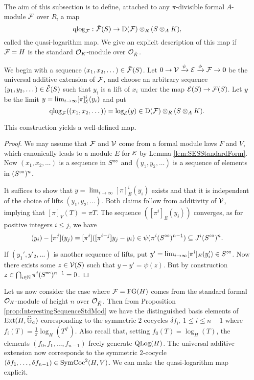 \documentclass[../main.tex]{subfiles}
\begin{document}
The aim of this subsection is to define, attached to any $\pi$-divisible formal
$A$-module $\mathcal{F}$ over $R$, a map
\begin{equation*}
\mathrm{qlog}_{\mathcal{F}}: \tilde {\mathcal{F}}(S) \to \mathrm{D}(\mathcal{F}) \otimes_R (S \otimes_A K),
\end{equation*}
called the quasi-logarithm map.
We give an explicit description of this map if $\mathcal{F} = H$ is the standard
$\mathcal{O}_K$-module over $\mathcal{O}_{\breve K}$. 

We begin with a sequence $(x_1, x_2, \dots) \in \tilde {\mathcal{F}}(S)$. 
Let $0 \to \mathcal{V} \xrightarrow{\psi} \mathcal{E} \xrightarrow{\phi} \mathcal{F} \to 0$ be the universal additive
extension of $\mathcal{F}$, and choose an arbitrary sequence $(y_1, y_2, \dots) \in
\tilde {\mathcal{E}}(S)$ such that $y_i$ is a lift of $x_i$ under the map $\mathcal{E}(S) \to \mathcal{F}(S)$. 
Let $y$ be the limit $y = \lim_{i \to \infty} [\pi]_{\mathcal{E}}^i(y_i)$ and put 
$$\mathrm{qlog}_{\mathcal{F}}((x_1, x_2, \dots)) = \log_{\mathcal{E}}(y) \in \mathrm{D}(\mathcal{F}) \otimes_R(S \otimes_A K).$$ 

\begin{prop}
  This construction yields a well-defined map. 
\begin{proof}
  We may assume that $\mathcal{F}$ and $\mathcal{V}$ come from a formal module laws $F$ and 
  $V$, which canonically
  leads to a module $E$ for $\mathcal{E}$ by Lemma \ref{lem:SESStandardForm}. Now
  $(x_1, x_2, \dots)$ is a sequence in $S^{\circ \hspace{-0.5pt} \circ}$ and $(y_1, y_2, \dots)$ is a
  sequence of elements in $(S^{\circ \hspace{-0.5pt} \circ})^n$.

  It suffices to show that $y = \lim_{i\to \infty} [\pi]^i_E(y_i)$ exists and 
  that it is independent of the choice of lifts $(y_1, y_2, \dots)$. 
  Both claims follow from additivity of $\mathcal{V}$, implying that 
  $[\pi]_{V}(T) = \pi T$. The sequence 
  $([\pi^i]_{E}(y_i))$ converges, as for positive integers $i\leq j$, we have 
  \begin{equation*}
    [\pi^i](y_i) - [\pi^j](y_j) = [\pi^i]([\pi^{i-j}]y_j - y_i)
    \in \psi(\pi^i (S^\cici)^{n-1}) \subseteq J^i (S^\cici)^{n}. 
  \end{equation*}

  If $(y_1', y'_2, \dots)$ is another sequence of lifts, put
  $y' = \lim_{i \to \infty} [\pi^i]_E (y_i') \in S^{\circ \hspace{-0.5pt} \circ}$. Now there exists some
  $z \in \mathcal{V}(S)$ such that 
  $y - y' = \psi(z)$. But by construction
  $z \in \bigcap_{i \in \mathbb{N}} \pi^i(S^{{\circ \hspace{-0.5pt} \circ}})^{n-1} = 0$.
\end{proof}
\end{prop}

Let us now consider the case where $\mathcal{F} = \textnormal{FG}(H)$ comes from the standard
formal $\mathcal{O}_K$-module of height $n$ over $\mathcal{O}_{\breve K}$. Then 
from Proposition \ref{prop:InterestingSequenceStdMod} we have the distinguished
basis elements of $\operatorname{Ext}(H,\widehat{\mathbb{G}}_a)$ corresponding to the symmetric $2$-cocycles
$\delta f_i$, $1 \leq i \leq n-1$ where $f_i(T) = \frac 1 \pi
\log_H(T^{q^i})$. Also recall that, setting $f_0(T) = \log_H(T)$, the elements 
$(f_0, f_1, \dots, f_{n-1})$ freely generate $\operatorname {QLog}(H)$. The universal
additive extension now corresponds to the symmetric $2$-cocycle $(\delta f_1,
\dots, \delta f_{n-1}) \in \operatorname{SymCoc}^2(H,V)$.
We can make the quasi-logarithm map explicit.
\end{document}
